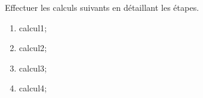 \documentclass[exercice]{thedocument}%
\begin{document}
%
Effectuer les calculs suivants en détaillant les étapes.
\begin{enumerate}
    \item\<calcul1;
    \item\<calcul2;
    \item\<calcul3;
    \item\<calcul4;
\end{enumerate}
\end{document}
